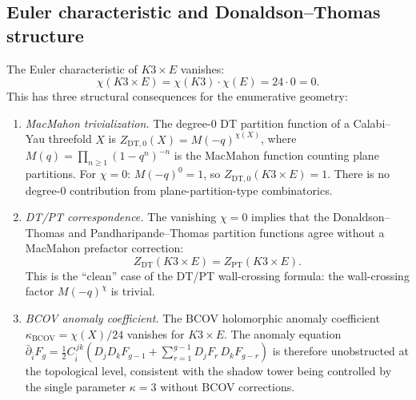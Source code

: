 \subsection{Euler characteristic and Donaldson--Thomas structure}
\label{subsec:euler-dt}

\begin{proposition}[$\chi(K3 \times E) = 0$ and its consequences;
\ClaimStatusProvedElsewhere]
\label{prop:chi-zero}
The Euler characteristic of $K3 \times E$ vanishes:
\[
\chi(K3 \times E) = \chi(K3) \cdot \chi(E)
= 24 \cdot 0 = 0.
\]
This has three structural consequences for the
enumerative geometry:
\begin{enumerate}[label=\textup{(\roman*)}]
\item \emph{MacMahon trivialization.}
The degree-$0$ DT partition function of a Calabi--Yau
threefold $X$ is $Z_{\mathrm{DT},0}(X) = M(-q)^{\chi(X)}$,
where $M(q) = \prod_{n \geq 1}(1-q^n)^{-n}$ is the
MacMahon function counting plane partitions. For
$\chi = 0$: $M(-q)^0 = 1$, so
$Z_{\mathrm{DT},0}(K3 \times E) = 1$. There is no
degree-$0$ contribution from plane-partition-type
combinatorics.
\item \emph{DT/PT correspondence.}
The vanishing $\chi = 0$ implies that the
Donaldson--Thomas and Pandharipande--Thomas partition
functions agree without a MacMahon prefactor correction:
\[
Z_{\mathrm{DT}}(K3 \times E)
= Z_{\mathrm{PT}}(K3 \times E).
\]
This is the ``clean'' case of the DT/PT wall-crossing
formula: the wall-crossing factor $M(-q)^{\chi}$ is trivial.
\item \emph{BCOV anomaly coefficient.}
The BCOV holomorphic anomaly coefficient
$\kappa_{\mathrm{BCOV}} = \chi(X)/24$ vanishes for
$K3 \times E$. The anomaly equation
$\bar{\partial}_{\bar{i}} F_g = \frac{1}{2}
C_{\bar{i}}^{\,jk}(D_j D_k F_{g-1} + \sum_{r=1}^{g-1}
D_j F_r\,D_k F_{g-r})$ is
therefore unobstructed at the topological level,
consistent with the shadow tower being controlled by the
single parameter $\kappa = 3$ without BCOV corrections.
\end{enumerate}
\end{proposition}

